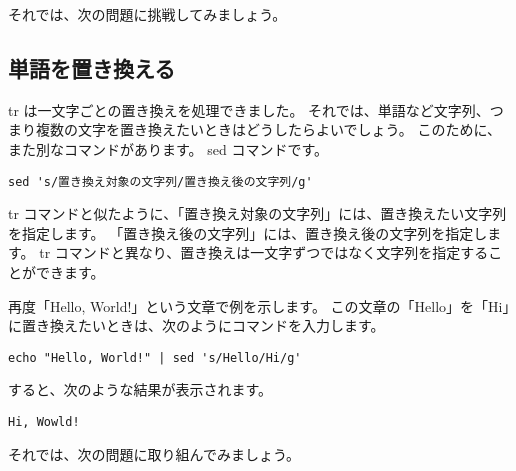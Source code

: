 それでは、次の問題に挑戦してみましょう。
\begin{enumerate}
\end{enumerate}

\subsection{単語を置き換える}
tr は一文字ごとの置き換えを処理できました。
それでは、単語など文字列、つまり複数の文字を置き換えたいときはどうしたらよいでしょう。
このために、また別なコマンドがあります。
sed コマンドです。

\begin{lstlisting}[caption=sed コマンドの基本的な使い方, label=sed_usage]
sed 's/置き換え対象の文字列/置き換え後の文字列/g'
\end{lstlisting}

tr コマンドと似たように、「置き換え対象の文字列」には、置き換えたい文字列を指定します。
「置き換え後の文字列」には、置き換え後の文字列を指定します。
tr コマンドと異なり、置き換えは一文字ずつではなく文字列を指定することができます。

再度「Hello, World!」という文章で例を示します。
この文章の「Hello」を「Hi」に置き換えたいときは、次のようにコマンドを入力します。

\begin{lstlisting}[caption=sed コマンドを使った例, label=sed_app]
echo "Hello, World!" | sed 's/Hello/Hi/g'
\end{lstlisting}

すると、次のような結果が表示されます。

\begin{lstlisting}[caption=sed コマンドで変換した結果, label=sed_result]
Hi, Wowld!
\end{lstlisting}

それでは、次の問題に取り組んでみましょう。

\begin{enumerate}
\end{enumerate}

